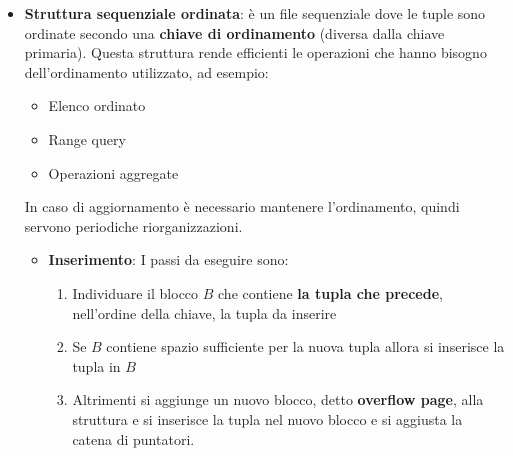 \documentclass[a4paper]{article}
\begin{document}
\begin{itemize}
    Ad ogni file viene assegnato un numero \( n \) di blocchi contigui e ciascun
    blocco è dotato di un numero \( m \) di posizioni disponibili per le tuple
    (quindi è un array bidimensionale \( n \times m \)). Ogni tupla è dotata di un
    valore numerico \( i \) che rappresenta l'indice della tupla in \( i \)-esima
    posizione nell'array.

    \begin{itemize}
      \item \textbf{Inserimento}: 
        \begin{itemize}
          \item Iniziale: l'indice \( i \) viene ottenuto incrementando un contatore
          \item Successivo: in una posizione libera oppure alla fine del file
        \end{itemize}

      \item \textbf{Cancellazioni}: creano delle posizioni libere
    \end{itemize}

  \item \textbf{Struttura sequenziale ordinata}: è un file sequenziale dove le tuple
    sono ordinate secondo una \textbf{chiave di ordinamento} (diversa dalla chiave
    primaria). Questa struttura rende efficienti le operazioni che hanno bisogno
    dell'ordinamento utilizzato, ad esempio:
    \begin{itemize}
      \item Elenco ordinato
      \item Range query
      \item Operazioni aggregate
    \end{itemize}
    In caso di aggiornamento è necessario mantenere l'ordinamento, quindi servono
    periodiche riorganizzazioni.

    \begin{itemize}
      \item \label{item:inserimento_ordinato} \textbf{Inserimento}: I passi da eseguire sono:
        \begin{enumerate}
          \item Individuare il blocco \( B \) che contiene \textbf{la tupla che precede},
            nell'ordine della chiave, la tupla da inserire
          \item Se \( B \) contiene spazio sufficiente per la nuova tupla allora si
            inserisce la tupla in \( B \)
          \item Altrimenti si aggiunge un nuovo blocco, detto \textbf{overflow page},
            alla struttura e si inserisce la tupla nel nuovo blocco e si aggiusta la
            catena di puntatori.
        \end{enumerate}


\end{itemize}
\end{itemize}
\end{document}
